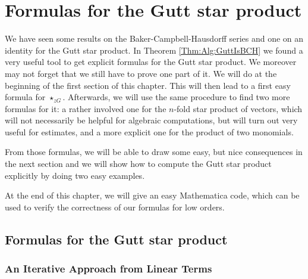 
%
%

\chapter{Formulas for the Gutt star product}

We have seen some results on the Baker-Campbell-Hausdorff series and one 
on an identity for the Gutt star product. In Theorem 
\ref{Thm:Alg:GuttIsBCH} we found a very useful tool to get explicit 
formulas for the Gutt star product. We moreover may not forget that we 
still have to prove one part of it. We will do at the beginning of the 
first section of this chapter. This will then lead to a first easy 
formula for $\star_{zG}$. Afterwards, we will use the same procedure to 
find two more formulas for it: a rather involved one for the $n$-fold 
star product of vectors, which will not necessarily be helpful for 
algebraic computations, but will turn out very useful for estimates, and 
a more explicit one for the product of two monomials.

From those formulas, we will be able to draw some easy, but nice 
consequences in the next section and we will show how to compute the 
Gutt star product explicitly by doing two easy examples.

At the end of this chapter, we will give an easy Mathematica code, which 
can be used to verify the correctness of our formulas for low orders.



\section{Formulas for the Gutt star product}
\label{sec:chap4_Formulas}


%
%

\subsection{An Iterative Approach from Linear Terms}

